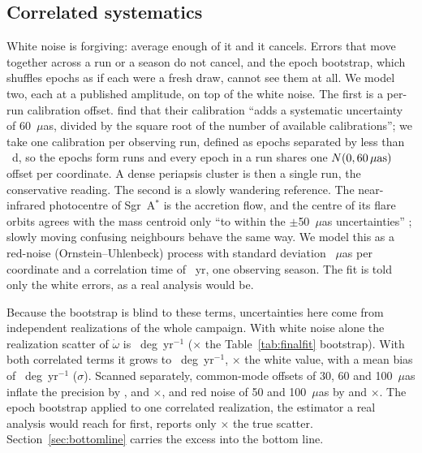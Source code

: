 \documentclass{aastex701}
\begin{document}
\subsection{Correlated systematics}
\label{sec:corrnoise}

White noise is forgiving: average enough of it and it cancels. Errors that move together across a run or a season do not cancel, and the epoch bootstrap, which shuffles epochs as if each were a fresh draw, cannot see them at all. We model two, each at a published amplitude, on top of the white noise. The first is a per-run calibration offset. \citet{gravity2022massdist} find that their calibration ``adds a systematic uncertainty of 60~$\mu$as, divided by the square root of the number of available calibrations''; we take one calibration per observing run, defined as epochs separated by less than \corrnoiseRunGapDays{}~d, so the \campaignNEpochs{} epochs form \corrnoiseNRuns{} runs and every epoch in a run shares one $N(0, 60{}\,\mu{\rm as})$ offset per coordinate. A dense periapsis cluster is then a single run, the conservative reading. The second is a slowly wandering reference. The near-infrared photocentre of Sgr~A$^*$ is the accretion flow, and the centre of its flare orbits agrees with the mass centroid only ``to within the $\pm$50~$\mu$as uncertainties'' \citep{gravity2018flares}; slowly moving confusing neighbours behave the same way. We model this as a red-noise (Ornstein--Uhlenbeck) process with standard deviation \corrnoiseRedNoiseUas{}~$\mu$as per coordinate and a correlation time of \corrnoiseRedTauYr{}~yr, one observing season. The fit is told only the white errors, as a real analysis would be.

Because the bootstrap is blind to these terms, uncertainties here come from \corrnoiseNRealizations{} independent realizations of the whole campaign. With white noise alone the realization scatter of $\dot\omega$ is \corrnoiseWhiteSigmaOmegaDot{}~deg~yr$^{-1}$ (\corrnoiseWhiteOverBootOmegaDot{}$\times$ the Table~\ref{tab:finalfit} bootstrap). With both correlated terms it grows to \corrnoiseFidSigmaOmegaDot{}~deg~yr$^{-1}$, \corrnoiseFidRatioOmegaDot{}$\times$ the white value, with a mean bias of \corrnoiseFidBiasOmegaDot{}~deg~yr$^{-1}$ (\corrnoiseFidBiasNsigma{}$\sigma$). Scanned separately, common-mode offsets of 30, 60 and 100~$\mu$as inflate the precision by \corrnoiseCommonThreeZeroRatio{}, \corrnoiseCommonSixZeroRatio{} and \corrnoiseCommonOneZeroZeroRatio{}$\times$, and red noise of 50 and 100~$\mu$as by \corrnoiseRedFiveZeroRatio{} and \corrnoiseRedOneZeroZeroRatio{}$\times$. The epoch bootstrap applied to one correlated realization, the estimator a real analysis would reach for first, reports only \corrnoiseFidBootOverMc{}$\times$ the true scatter. Section~\ref{sec:bottomline} carries the excess into the bottom line.
\end{document}
